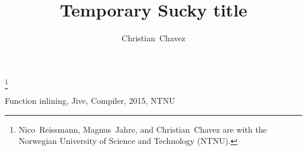 \documentclass[journal, a4paper, twoside, romanappendices]{IEEEtran}
\begin{document}
\title{Temporary Sucky title}
\author{Christian~Chavez}
\maketitle

\thanks{Nico~Reissmann, Magnus~Jahre, and Christian~Chavez are with the
Norwegian University of Science and Technology (NTNU).}


\begin{IEEEkeywords}
Function inlining, Jive, Compiler, 2015, NTNU
\end{IEEEkeywords}











%
%
\end{document}
